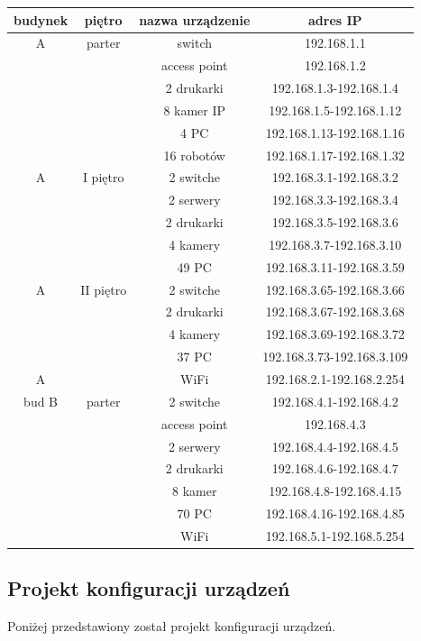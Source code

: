\documentclass{article}
\begin{document}
	\begin{tabular}[!ht]{c|c|c|c}
	budynek &	piętro &	nazwa urządzenie & adres IP\\
	\hline
	A	& parter &	switch & 192.168.1.1\\
	& &access point	& 192.168.1.2\\
	& &2 drukarki	& 192.168.1.3-192.168.1.4\\
	& & 8 kamer IP &	192.168.1.5-192.168.1.12\\
	& & 4 PC	& 192.168.1.13-192.168.1.16\\
	& & 16  robotów &	192.168.1.17-192.168.1.32\\ \hline
	
	A&I piętro	&2 switche	&192.168.3.1-192.168.3.2\\
	&&2 serwery	&192.168.3.3-192.168.3.4\\
	&&2 drukarki&	192.168.3.5-192.168.3.6\\
	&&4 kamery	&192.168.3.7-192.168.3.10\\
	&&49 PC	&192.168.3.11-192.168.3.59\\
	\hline
	
	A &II piętro&	2 switche&	192.168.3.65-192.168.3.66\\
	&&2 drukarki	&192.168.3.67-192.168.3.68\\
	&&4 kamery	&192.168.3.69-192.168.3.72\\
	&&37 PC	&192.168.3.73-192.168.3.109\\
	\hline
	A & &	WiFi	 &192.168.2.1-192.168.2.254\\
	\hline
\hline

bud B &	parter&2 switche&	192.168.4.1-192.168.4.2\\
&& access point	&192.168.4.3\\
&&2 serwery	&192.168.4.4-192.168.4.5\\
&&2 drukarki&	192.168.4.6-192.168.4.7\\
&&8 kamer	&192.168.4.8-192.168.4.15\\
&&70 PC	&192.168.4.16-192.168.4.85\\
\hline
&&WiFi &	192.168.5.1-192.168.5.254\\
\hline

\end{tabular}
\subsection{Projekt konfiguracji urządzeń}
Poniżej przedstawiony został projekt konfiguracji urządzeń.
\end{document}
